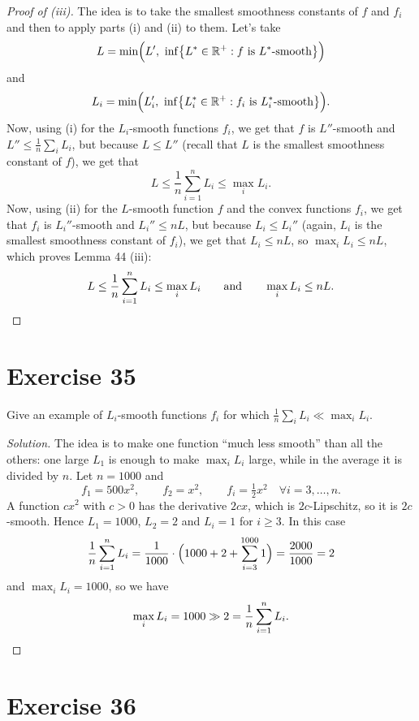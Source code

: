 \documentclass[11pt,a4paper]{article}
\newcommand{\R}{\mathbb{R}}
\begin{document}
\begin{proof}[Proof of (iii)]
The idea is to take the smallest smoothness constants of $f$ and $f_i$ and then to apply
parts (i) and (ii) to them. Let's take
\[
  L = \min\Bigl(L',\ \inf\bigl\{L^* \in \R^+ : f \text{ is } L^*\text{-smooth}\bigr\}\Bigr)
\]
and
\[
  L_i = \min\Bigl(L_i',\ \inf\bigl\{L_i^* \in \R^+ : f_i \text{ is } L_i^*\text{-smooth}\bigr\}\Bigr).
\]
Now, using (i) for the $L_i$-smooth functions $f_i$, we get that $f$ is $L''$-smooth and
$L'' \le \frac{1}{n}\sum_i L_i$, but because $L \le L''$ (recall that $L$ is the smallest smoothness
constant of $f$), we get that
\[
  L \le \frac{1}{n}\sum_{i=1}^n L_i \le \max_i L_i .
\]
Now, using (ii) for the $L$-smooth function $f$ and the convex functions $f_i$, we get that $f_i$ is
$L_i''$-smooth and $L_i'' \le nL$, but because $L_i \le L_i''$ (again, $L_i$ is the smallest smoothness
constant of $f_i$), we get that $L_i \le nL$, so $\max_i L_i \le nL$, which proves Lemma 44 (iii):
\[
  L \le \frac{1}{n}\sum_{i=1}^n L_i \le \max_i L_i \qquad \text{and} \qquad \max_i L_i \le nL . \qedhere
\]
\end{proof}

\section*{Exercise 35}

Give an example of $L_i$-smooth functions $f_i$ for which
$\frac{1}{n}\sum_i L_i \ll \max_i L_i$.

\begin{proof}[Solution]
The idea is to make one function ``much less smooth'' than all the others: one large $L_1$ is enough to
make $\max_i L_i$ large, while in the average it is divided by $n$. Let $n = 1000$ and
\[
  f_1 = 500x^2, \qquad f_2 = x^2, \qquad f_i = \tfrac{1}{2}x^2 \quad \forall i = 3,\dots,n.
\]
A function $cx^2$ with $c > 0$ has the derivative $2cx$, which is $2c$-Lipschitz, so it is $2c$-smooth.
Hence $L_1 = 1000$, $L_2 = 2$ and $L_i = 1$ for $i \ge 3$. In this case
\[
  \frac{1}{n}\sum_{i=1}^n L_i = \frac{1}{1000}\cdot\Bigl(1000 + 2 + \sum_{i=3}^{1000} 1\Bigr)
  = \frac{2000}{1000} = 2
\]
and $\max_i L_i = 1000$, so we have
\[
  \max_i L_i = 1000 \gg 2 = \frac{1}{n}\sum_{i=1}^n L_i . \qedhere
\]
\end{proof}

\section*{Exercise 36}
\end{document}
